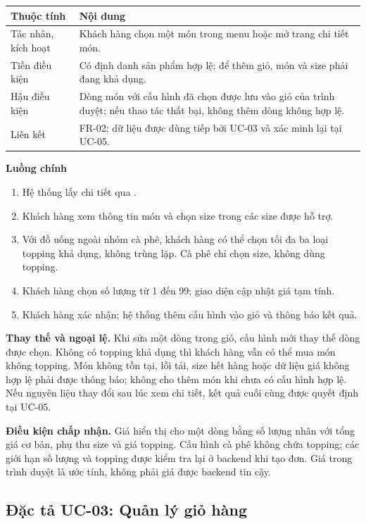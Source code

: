 \begin{longtable}{|p{3.1cm}|p{11.5cm}|}
\hline \textbf{Thuộc tính} & \textbf{Nội dung} \\ \hline
Tác nhân, kích hoạt & Khách hàng chọn một món trong menu hoặc mở trang
chi tiết món. \\ \hline
Tiền điều kiện & Có định danh sản phẩm hợp lệ; để thêm giỏ, món và size
phải đang khả dụng. \\ \hline
Hậu điều kiện & Dòng món với cấu hình đã chọn được lưu vào giỏ của trình
duyệt; nếu thao tác thất bại, không thêm dòng không hợp lệ. \\ \hline
Liên kết & FR-02; dữ liệu được dùng tiếp bởi UC-03 và xác minh lại tại UC-05. \\ \hline
\end{longtable}

\textbf{Luồng chính}
\begin{enumerate}[nosep]
  \item Hệ thống lấy chi tiết qua .
  \item Khách hàng xem thông tin món và chọn size trong các size được hỗ trợ.
  \item Với đồ uống ngoài nhóm cà phê, khách hàng có thể chọn tối đa ba
  loại topping khả dụng, không trùng lặp. Cà phê chỉ chọn size, không dùng topping.
  \item Khách hàng chọn số lượng từ 1 đến 99; giao diện cập nhật giá tạm tính.
  \item Khách hàng xác nhận; hệ thống thêm cấu hình vào giỏ và thông báo kết quả.
\end{enumerate}

\textbf{Thay thế và ngoại lệ.} Khi sửa một dòng trong giỏ, cấu hình mới
thay thế dòng được chọn. Không có topping khả dụng thì khách hàng vẫn có
thể mua món không topping. Món không tồn tại, lỗi tải, size hết hàng hoặc
dữ liệu giá không hợp lệ phải được thông báo; không cho thêm món khi chưa
có cấu hình hợp lệ. Nếu nguyên liệu thay đổi sau lúc xem chi tiết, kết
quả cuối cùng được quyết định tại UC-05.

\textbf{Điều kiện chấp nhận.} Giá hiển thị cho một dòng bằng số lượng
nhân với tổng giá cơ bản, phụ thu size và giá topping. Cấu hình cà phê
không chứa topping; các giới hạn số lượng và topping được kiểm tra lại ở
backend khi tạo đơn. Giá trong trình duyệt là ước tính, không phải giá
được backend tin cậy.

\subsection{Đặc tả UC-03: Quản lý giỏ hàng}
\label{uc:03}
\label{uc03}

